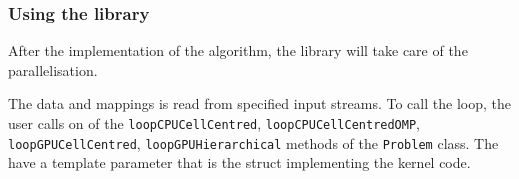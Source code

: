 \subsubsection{Using the library}

After the implementation of the algorithm, the library will take care of the
parallelisation.

The data and mappings is read from specified input streams. To call the loop,
the user calls on of the \lstinline!loopCPUCellCentred!,
\lstinline!loopCPUCellCentredOMP!, \lstinline!loopGPUCellCentred!,
\lstinline!loopGPUHierarchical! methods of the \lstinline!Problem! class. The
have a template parameter that is the struct implementing the kernel code.
